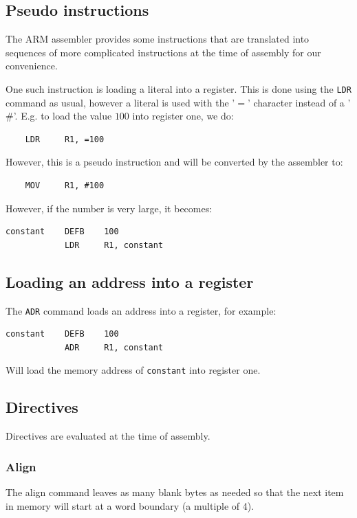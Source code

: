 \documentclass{article}
\begin{document}
\subsection{Pseudo instructions}

The ARM assembler provides some instructions that are translated into sequences of more complicated instructions at the time of assembly for our convenience.

One such instruction is loading a literal into a register. This is done using the {\tt LDR} command as usual, however a literal is used with the '$=$' character instead of a '$\#$'. E.g. to load the value $100$ into register one, we do:

\begin{verbatim}
	LDR 	R1, =100
\end{verbatim}

However, this is a pseudo instruction and will be converted by the assembler to:

\begin{verbatim}
	MOV 	R1, #100
\end{verbatim}

However, if the number is very large, it becomes:

\begin{verbatim}
constant	DEFB 	100
			LDR 	R1, constant
\end{verbatim}

\subsection{Loading an address into a register}

The {\tt ADR} command loads an address into a register, for example:

\begin{verbatim}
constant	DEFB 	100
			ADR 	R1, constant
\end{verbatim}

Will load the memory address of {\tt constant} into register one.

\subsection{Directives}
Directives are evaluated at the time of assembly.

\subsubsection{Align}
\label{subsubsec:align}
The align command leaves as many blank bytes as needed so that the next item in memory will start at a word boundary (a multiple of 4).
\end{document}
